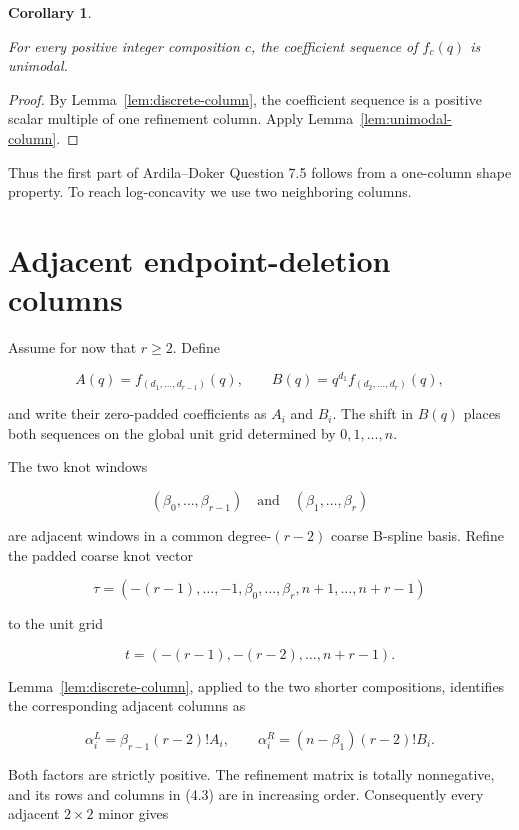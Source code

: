 \documentclass[11pt]{article}
\newtheorem{corollary}[theorem]{Corollary}
\begin{document}
\Needspace{0.18\textheight}
\begin{corollary}
\label{cor:unimodal}

For every positive integer composition $c$, the coefficient sequence of $f_c(q)$ is unimodal.

\end{corollary}

\begin{proof}

By Lemma~\ref{lem:discrete-column}, the coefficient sequence is a positive scalar multiple of one refinement column.
Apply Lemma~\ref{lem:unimodal-column}.
\end{proof}


Thus the first part of Ardila--Doker Question 7.5 follows from a one-column shape property. To reach
log-concavity we use two neighboring columns.

\section{Adjacent endpoint-deletion columns}


Assume for now that $r\geq2$. Define

\[
A(q)=f_{(d_1,\ldots,d_{r-1})}(q),
\qquad
B(q)=q^{d_1}f_{(d_2,\ldots,d_r)}(q),
\tag{4.1}
\]

and write their zero-padded coefficients as $A_i$ and $B_i$. The shift in $B(q)$ places both
sequences on the global unit grid determined by $0,1,\ldots,n$.

The two knot windows

\[
(\beta_0,\ldots,\beta_{r-1})
\quad\text{and}\quad
(\beta_1,\ldots,\beta_r)
\tag{4.2}
\]

are adjacent windows in a common degree-$(r-2)$ coarse B-spline basis. Refine the padded coarse knot
vector

\[
\tau=(-(r-1),\ldots,-1,\beta_0,\ldots,\beta_r,n+1,\ldots,n+r-1)
\]

to the unit grid

\[
t=(-(r-1),-(r-2),\ldots,n+r-1).
\]

Lemma~\ref{lem:discrete-column}, applied to the two shorter compositions, identifies the corresponding adjacent columns
as

\[
\alpha_i^L=\beta_{r-1}(r-2)!A_i,
\qquad
\alpha_i^R=(n-\beta_1)(r-2)!B_i.
\tag{4.3}
\]

Both factors are strictly positive. The refinement matrix is totally nonnegative, and its rows and
columns in (4.3) are in increasing order. Consequently every adjacent $2\times2$ minor gives
\end{document}
